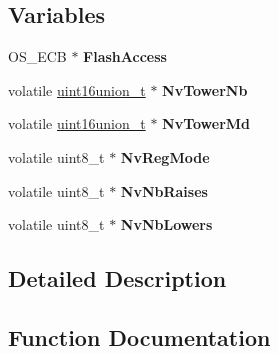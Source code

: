 \subsection*{Variables}
\begin{DoxyCompactItemize}
\item 
\hypertarget{group__flash__module_ga7c987f2ca3c0336439fb51035967186f}{}O\+S\+\_\+\+E\+C\+B $\ast$ {\bfseries Flash\+Access}\label{group__flash__module_ga7c987f2ca3c0336439fb51035967186f}

\item 
\hypertarget{group__flash__module_ga65fc76be2b0895efd0e3ba05ce041c8b}{}volatile \hyperlink{unionuint16union__t}{uint16union\+\_\+t} $\ast$ {\bfseries Nv\+Tower\+Nb}\label{group__flash__module_ga65fc76be2b0895efd0e3ba05ce041c8b}

\item 
\hypertarget{group__flash__module_ga34f4a2041161f5c8cda7808c766d53d0}{}volatile \hyperlink{unionuint16union__t}{uint16union\+\_\+t} $\ast$ {\bfseries Nv\+Tower\+Md}\label{group__flash__module_ga34f4a2041161f5c8cda7808c766d53d0}

\item 
\hypertarget{group__flash__module_gaf88f43b6eae3074c414ebd8a3f5a9805}{}volatile uint8\+\_\+t $\ast$ {\bfseries Nv\+Reg\+Mode}\label{group__flash__module_gaf88f43b6eae3074c414ebd8a3f5a9805}

\item 
\hypertarget{group__flash__module_ga238e81a23614407f664e73f8a3d0b7fe}{}volatile uint8\+\_\+t $\ast$ {\bfseries Nv\+Nb\+Raises}\label{group__flash__module_ga238e81a23614407f664e73f8a3d0b7fe}

\item 
\hypertarget{group__flash__module_ga06256289e4edfe7e871779cd6c059053}{}volatile uint8\+\_\+t $\ast$ {\bfseries Nv\+Nb\+Lowers}\label{group__flash__module_ga06256289e4edfe7e871779cd6c059053}

\end{DoxyCompactItemize}


\subsection{Detailed Description}


\subsection{Function Documentation}
\hypertarget{group__flash__module_ga50871aff0f5af1e092aea3ed2545cf72}{}
